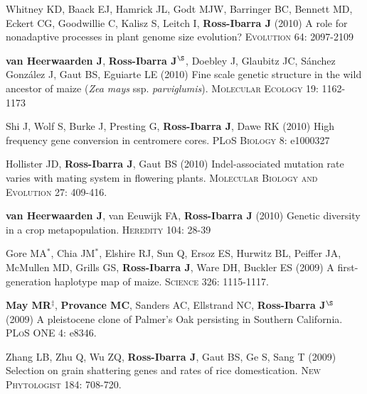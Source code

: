\documentclass[letterpaper]{article}
\begin{document}
\begin{etaremune}
\item Whitney KD, Baack EJ, Hamrick JL, Godt MJW, Barringer BC, Bennett MD, Eckert CG, Goodwillie C, Kalisz S, Leitch I, {\bf Ross-Ibarra J} (2010) A role for nonadaptive processes in plant genome size evolution?  \textsc{Evolution} 64: 2097-2109
\\%

\item {\bf van Heerwaarden J}, {\bf Ross-Ibarra J}$^\S$, Doebley J, Glaubitz JC, S\'{a}nchez Gonz\'{a}lez J, Gaut BS, Eguiarte LE (2010) Fine scale genetic structure in the wild ancestor of maize (\emph{Zea mays} ssp. \emph{parviglumis}).  \textsc{Molecular Ecology} 19: 1162-1173
\\%

\item Shi J, Wolf S, Burke J, Presting G, {\bf Ross-Ibarra J}, Dawe RK (2010) High frequency gene conversion in centromere cores.  \textsc{PLoS Biology} 8: e1000327
\\%

\item Hollister JD, {\bf Ross-Ibarra J}, Gaut BS (2010) Indel-associated mutation rate varies with mating system in flowering plants.  \textsc{Molecular Biology and Evolution} 27: 409-416.
\\%

\item {\bf van Heerwaarden J}, van Eeuwijk FA, {\bf Ross-Ibarra J} (2010) Genetic diversity in a crop metapopulation.  \textsc{Heredity} 104: 28-39
\\%

\item Gore MA$^*$, Chia JM$^*$, Elshire RJ, Sun Q, Ersoz ES, Hurwitz BL, Peiffer JA, McMullen MD, Grills GS, {\bf Ross-Ibarra J}, Ware DH, Buckler ES (2009) A first-generation haplotype map of maize.  \textsc{Science 326}: 1115-1117.
\\%

\item {\bf May MR}$^\ddagger$, {\bf Provance MC}, Sanders AC, Ellstrand NC, {\bf Ross-Ibarra J}$^\S$ (2009) A pleistocene clone of Palmer's Oak persisting in Southern California.  \textsc{PLoS ONE} 4: e8346.
\\%

\item Zhang LB, Zhu Q, Wu ZQ, {\bf Ross-Ibarra J}, Gaut BS, Ge S, Sang T (2009) Selection on grain shattering genes and rates of rice domestication.  \textsc{New Phytologist} 184: 708-720.
\\%


\end{etaremune}
\end{document}
